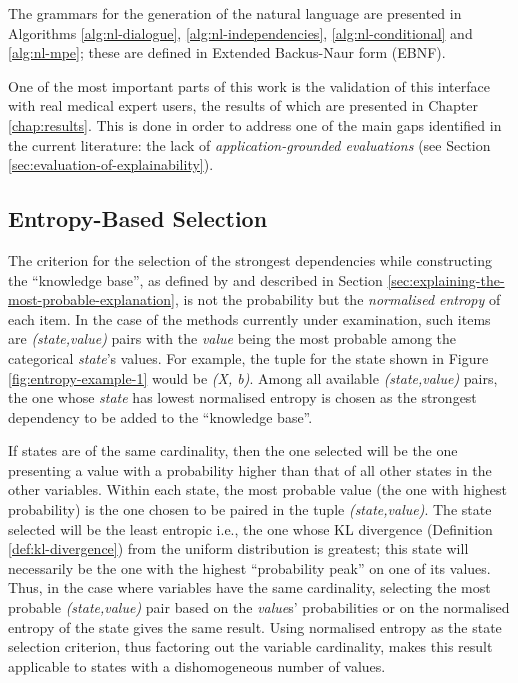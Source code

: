 The grammars for the generation of the natural language are presented in Algorithms \ref{alg:nl-dialogue}, \ref{alg:nl-independencies}, \ref{alg:nl-conditional} and \ref{alg:nl-mpe}; these are defined in Extended Backus-Naur form (EBNF).

One of the most important parts of this work is the validation of this interface with real medical expert users, the results of which are presented in Chapter \ref{chap:results}.
This is done in order to address one of the main gaps identified in the current literature: the lack of \textit{application-grounded evaluations} (see Section \ref{sec:evaluation-of-explainability}).

\subsection{Entropy-Based Selection} \label{subsec:entropy-based-selection}
The criterion for the selection of the strongest dependencies while constructing the \enquote{knowledge base}, as defined by \citet{Butz2018} and described in Section \ref{sec:explaining-the-most-probable-explanation}, is not the probability but the \textit{normalised entropy} of each item.
In the case of the methods currently under examination, such items are \textit{(state,value)} pairs with the \textit{value} being the most probable among the categorical \textit{state}'s values.
For example, the tuple for the state shown in Figure \ref{fig:entropy-example-1} would be \textit{(X, b)}.
Among all available \textit{(state,value)} pairs, the one whose \textit{state} has lowest normalised entropy is chosen as the strongest dependency to be added to the \enquote{knowledge base}.

If states are of the same cardinality, then the one selected will be the one presenting a value with a probability higher than that of all other states in the other variables.
Within each state, the most probable value (the one with highest probability) is the one chosen to be paired in the tuple \textit{(state,value)}.
The state selected will be the least entropic i.e., the one whose KL divergence (Definition \ref{def:kl-divergence}) from the uniform distribution is greatest; this state will necessarily be the one with the highest \enquote{probability peak} on one of its values.
Thus, in the case where variables have the same cardinality, selecting the most probable \textit{(state,value)} pair based on the \textit{value}s' probabilities or on the normalised entropy of the state gives the same result.
Using normalised entropy as the state selection criterion, thus factoring out the variable cardinality, makes this result applicable to states with a dishomogeneous number of values.

